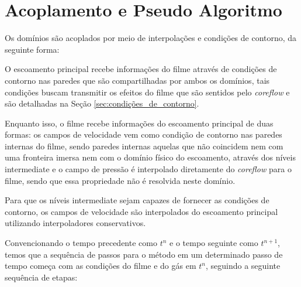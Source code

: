 \section{Acoplamento e Pseudo Algoritmo}
\label{sec:acoplamento}
Os domínios são acoplados por meio de interpolações e condições de contorno, da seguinte forma:

O escoamento principal recebe informações do filme através de condições de contorno nas paredes que são compartilhadas por ambos os domínios, tais condições buscam transmitir os efeitos do filme que são sentidos pelo \textit{coreflow} e são detalhadas na Seção \ref{sec:condições_de_contorno}. 

Enquanto isso, o filme recebe informações do escoamento principal de duas formas: os campos de velocidade vem como condição de contorno nas paredes internas do filme, sendo paredes internas aquelas que não coincidem nem com uma fronteira imersa nem com o domínio físico do escoamento, através dos níveis intermediate e o campo de pressão é interpolado diretamente do \textit{coreflow} para o filme, sendo que essa propriedade não é resolvida neste domínio.

Para que os níveis intermediate sejam capazes de fornecer as condições de contorno, os campos de velocidade são interpolados do escoamento principal utilizando interpoladores conservativos.

Convencionando o tempo precedente como $t^n$ e o tempo seguinte como $t^{n+1}$, temos que a sequência de passos para o método em um determinado passo de tempo começa com as condições do filme e do gás em $t^n$, seguindo a seguinte sequência de etapas:

